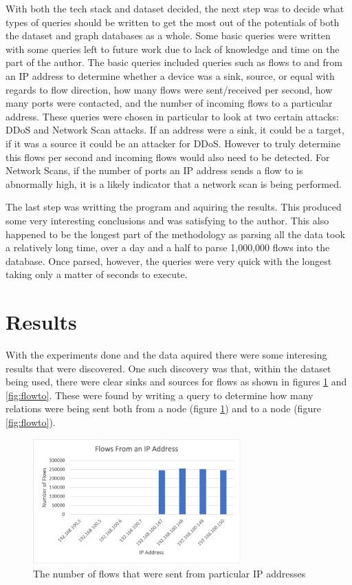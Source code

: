 \documentclass[conference]{IEEEtran}
\begin{document}
With both the tech stack and dataset decided, the next step was to decide what types of queries should be
written to get the most out of the potentials of both the dataset and graph databases as a whole. Some basic
queries were written with some queries left to future work due to lack of knowledge and time on the part of 
the author. The basic queries included queries such as flows to and from an IP address to determine whether
a device was a sink, source, or equal with regards to flow direction, how many flows were sent/received per
second, how many ports were contacted, and the number of incoming flows to a particular address. These queries
were chosen in particular to look at two certain attacks: DDoS and Network Scan attacks. If an address were a 
sink, it could be a target, if it was a source it could be an attacker for DDoS. However to truly determine this
flows per second and incoming flows would also need to be detected. For Network Scans, if the number of ports
an IP address sends a flow to is abnormally high, it is a likely indicator that a network scan is being performed.

The last step was writting the program and aquiring the results. This produced some very interesting conclusions
and was satisfying to the author. This also happened to be the longest part of the methodology as parsing all the
data took a relatively long time, over a day and a half to parse 1,000,000 flows into the database. Once parsed,
however, the queries were very quick with the longest taking only a matter of seconds to execute.

\section{Results}

With the experiments done and the data aquired there were some interesing results that were discovered. One such
discovery was that, within the dataset being used, there were clear sinks and sources for flows as shown in figures
\ref{fig:flowfrom} and \ref{fig:flowto}. These were found by writing a query to determine how many relations were 
being sent both from a node (figure \ref{fig:flowfrom}) and to a node (figure \ref{fig:flowto}).

\begin{figure}[htbp]
    \includegraphics[width=8cm]{Figure1.png}
    \centering
    \caption{The number of flows that were sent from particular IP addresses}
    \label{fig:flowfrom}
\end{figure}
\end{document}

